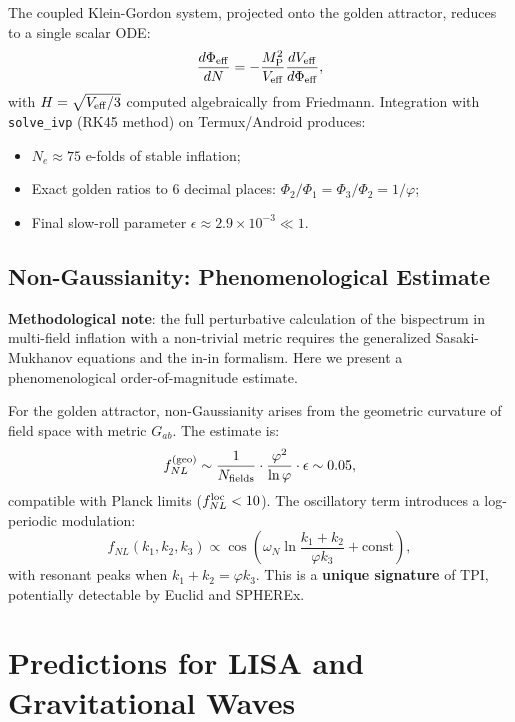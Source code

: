 \documentclass[11pt,a4paper]{article}
\theoremstyle{definition}
\begin{document}
The coupled Klein-Gordon system, projected onto the golden attractor, reduces to a single scalar ODE:
\begin{equation}
\frac{d\Phi_{\rm eff}}{dN} = -\frac{M_{\rm P}^2}{V_{\rm eff}} \frac{dV_{\rm eff}}{d\Phi_{\rm eff}},
\end{equation}
with $H = \sqrt{V_{\rm eff}/3}$ computed algebraically from Friedmann. Integration with \texttt{solve\_ivp} (RK45 method) on Termux/Android produces:
\begin{itemize}
    \item $N_e \approx 75$ e-folds of stable inflation;
    \item Exact golden ratios to 6 decimal places: $\Phi_2/\Phi_1 = \Phi_3/\Phi_2 = 1/\varphi$;
    \item Final slow-roll parameter $\epsilon \approx 2.9 \times 10^{-3} \ll 1$.
\end{itemize}

\subsection{Non-Gaussianity: Phenomenological Estimate}
\label{subsec:fnl}

\textbf{Methodological note}: the full perturbative calculation of the bispectrum in multi-field inflation with a non-trivial metric requires the generalized Sasaki-Mukhanov equations and the in-in formalism. Here we present a phenomenological order-of-magnitude estimate.

For the golden attractor, non-Gaussianity arises from the geometric curvature of field space with metric $G_{ab}$. The estimate is:
\begin{equation}
f_{NL}^{\rm (geo)} \sim \frac{1}{N_{\rm fields}} \cdot \frac{\varphi^2}{\ln\varphi} \cdot \epsilon \sim 0.05,
\end{equation}
compatible with Planck limits ($f_{NL}^{\rm loc} < 10$). The oscillatory term introduces a log-periodic modulation:
\begin{equation}
f_{NL}(k_1, k_2, k_3) \propto \cos\left( \omega_N \ln\frac{k_1 + k_2}{\varphi k_3} + \text{const} \right),
\end{equation}
with resonant peaks when $k_1 + k_2 = \varphi k_3$. This is a \textbf{unique signature} of TPI, potentially detectable by Euclid and SPHEREx.

\section{Predictions for LISA and Gravitational Waves}\label{sec:lisa}
\end{document}
